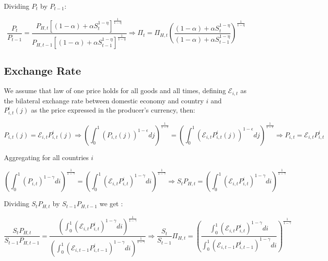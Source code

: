 \documentclass{article}
\newcommand{\E}{\mathcal{E}}
\begin{document}
Dividing $P_t$ by $P_{t-1}$:

\begin{equation}
    \label{tot}
    \frac{P_t}{P_{t-1}} = \frac{P_{H,t} \left[(1-\alpha) + \alpha S_t^{1-\eta} \right]^{\frac{1}{1-\eta}}} {P_{H,t-1} \left[(1-\alpha) + \alpha S_{t-1}^{1-\eta} \right]^{\frac{1}{1-\eta}}} \Rightarrow \Pi_t = \Pi_{H,t} \left(\frac{(1-\alpha) + \alpha S_t^{1-\eta}} {(1-\alpha) + \alpha S_{t-1}^{1-\eta}} \right)^{\frac{1}{1-\eta}}
\end{equation}

\subsection{Exchange Rate}
We assume that law of one price holds for all goods and all times, defining $\E_{i,t}$ as the bilateral exchange rate between domestic economy and country $i$ and $P^i_{i,t}(j)$ as the price expressed in the producer's currency, then:

\begin{equation}
    P_{i,t}(j) = \E_{i,t} P^i_{i,t}(j) \Rightarrow \left( \int^1_0 \left(P_{i,t}(j) \right)^{1-\epsilon} dj \right)^{\frac{1}{1-\epsilon}} = \left( \int^1_0 \left(\E_{i,t} P^i_{i,t}(j) \right)^{1-\epsilon} dj \right)^{\frac{1}{1-\epsilon}} \Rightarrow P_{i,t} = \E_{i,t} P^i_{i,t}
\end{equation}


Aggregating for all countries $i$

\begin{equation}
    \left( \int^1_0 \left(P_{i,t} \right)^{1-\gamma} di \right)^{\frac{1}{1-\gamma}} = \left( \int^1_0 \left(\E_{i,t} P^i_{i,t} \right)^{1-\gamma} di \right)^{\frac{1}{1-\gamma}} \Rightarrow S_t P_{H,t} = \left( \int^1_0 \left(\E_{i,t} P^i_{i,t} \right)^{1-\gamma} di \right)^{\frac{1}{1-\gamma}}
\end{equation}

Dividing $S_t P_{H,t}$ by $S_{t-1} P_{H,t-1}$ we get :

\begin{equation}
    \label{fx}
    \frac{S_t P_{H,t}}{S_{t-1} P_{H,t-1}} = \frac{\left( \int^1_0 \left(\E_{i,t} P^i_{i,t} \right)^{1-\gamma} di \right)^{\frac{1}{1-\gamma}}}{\left( \int^1_0 \left(\E_{i,t-1} P^i_{i,t-1} \right)^{1-\gamma} di \right)^{\frac{1}{1-\gamma}}} \Rightarrow \frac{S_t}{S_{t-1}}\Pi_{H,t} = \left(\frac{\int^1_0 \left(\E_{i,t} P^i_{i,t} \right)^{1-\gamma} di }{\int^1_0 \left(\E_{i,t-1} P^i_{i,t-1} \right)^{1-\gamma} di} \right)^{\frac{1}{1-\gamma}}
\end{equation}
\end{document}
